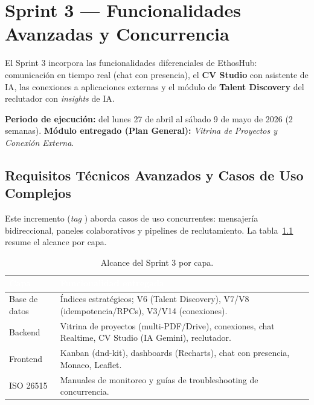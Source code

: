 \chapter{Sprint 3 — Funcionalidades Avanzadas y Concurrencia}
\label{cap:sprint3}

El Sprint 3 incorpora las funcionalidades diferenciales de EthosHub: comunicación en tiempo
real (chat con presencia), el \textbf{CV Studio} con asistente de IA, las conexiones a
aplicaciones externas y el módulo de \textbf{Talent Discovery} del reclutador con \textit{insights}
de IA.\par

\textbf{Periodo de ejecución:} del lunes 27 de abril al sábado 9 de mayo de 2026 (2 semanas).
\textbf{Módulo entregado (Plan General):} \textit{Vitrina de Proyectos y Conexión Externa}.\par

\section{Requisitos Técnicos Avanzados y Casos de Uso Complejos}
\label{sec:s3_resumen}

Este incremento (\textit{tag} ) aborda casos de uso concurrentes:
mensajería bidireccional, paneles colaborativos y pipelines de reclutamiento. La
tabla~\ref{tab:s3_alcance} resume el alcance por capa.

\begin{table}[!ht]
    \centering
    \renewcommand{\arraystretch}{1.35}
    \fontsize{9}{10.8}\selectfont\sffamily
    \begin{tabularx}{\textwidth}{|l|X|}
        \hline
        \rowcolor{colorPrimario}
        \textcolor{white}{\textbf{Capa}} & \textcolor{white}{\textbf{Funcionalidad entregada}} \\ \hline
        Base de datos & Índices estratégicos; V6 (Talent Discovery), V7/V8 (idempotencia/RPCs), V3/V14 (conexiones). \\ \hline
        \rowcolor{grisTecnico}
        Backend & Vitrina de proyectos (multi-PDF/Drive), conexiones, chat Realtime, CV Studio (IA Gemini), reclutador. \\ \hline
        Frontend & Kanban (dnd-kit), dashboards (Recharts), chat con presencia, Monaco, Leaflet. \\ \hline
        \rowcolor{grisTecnico}
        ISO 26515 & Manuales de monitoreo y guías de troubleshooting de concurrencia. \\ \hline
    \end{tabularx}
    \caption{Alcance del Sprint 3 por capa.}
    \label{tab:s3_alcance}
\end{table}

